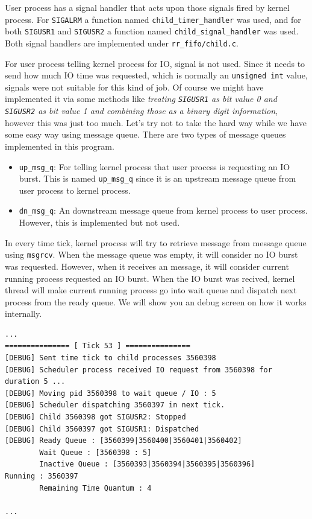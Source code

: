 \documentclass{homework}
\begin{document}
User process has a signal handler that acts upon those signals fired by kernel process. For \texttt{SIGALRM} a function named \texttt{child_timer_handler} was used, and for both \texttt{SIGUSR1} and \texttt{SIGUSR2} a function named \texttt{child_signal_handler} was used. Both signal handlers are implemented under \texttt{rr_fifo/child.c}. 

For user process telling kernel process for IO, signal is not used. Since it needs to send how much IO time was requested, which is normally an \texttt{unsigned int} value, signals were not suitable for this kind of job. Of course we might have implemented it via some methods like \textit{treating \texttt{SIGUSR1} as bit value 0 and \texttt{SIGUSR2} as bit value 1 and combining those as a binary digit information}, however this was just too much. Let's try not to take the hard way while we have some easy way using message queue. There are two types of message queues implemented in this program.
\begin{itemize}
    \item \texttt{up_msg_q}: For telling kernel process that user process is requesting an IO burst. This is named \texttt{up_msg_q} since it is an upstream message queue from user process to kernel process.
    \item \texttt{dn_msg_q}: An downstream message queue from kernel process to user process. However, this is implemented but not used.
\end{itemize}
In every time tick, kernel process will try to retrieve message from message queue using \texttt{msgrcv}. When the message queue was empty, it will consider no IO burst was requested. However, when it receives an message, it will consider current running process requested an IO burst. When the IO burst was recived, kernel thread will make current running process go into wait queue and dispatch next process from the ready queue. We will show you an debug screen on how it works internally.
\\
\begin{center}
\begin{code}
\begin{verbatim}
...
=============== [ Tick 53 ] ===============
[DEBUG] Sent time tick to child processes 3560398
[DEBUG] Scheduler process received IO request from 3560398 for duration 5 ...
[DEBUG] Moving pid 3560398 to wait queue / IO : 5
[DEBUG] Scheduler dispatching 3560397 in next tick.
[DEBUG] Child 3560398 got SIGUSR2: Stopped
[DEBUG] Child 3560397 got SIGUSR1: Dispatched
[DEBUG] Ready Queue : [3560399|3560400|3560401|3560402]
        Wait Queue : [3560398 : 5]
        Inactive Queue : [3560393|3560394|3560395|3560396]
Running : 3560397
        Remaining Time Quantum : 4

...
\end{verbatim}
\end{code}
\end{center}
\end{document}
